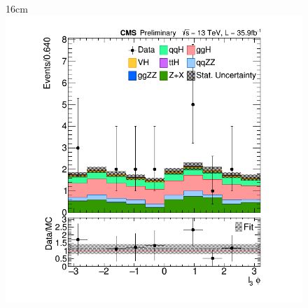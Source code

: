 \begin{figure}[hbtp]{16cm}
{		\includegraphics[scale=0.23,trim={2cm 1cm 2cm 1cm},clip]{ChapterAnalysis/figs/vbf_l3_phi}
	}\\
	\subfloat[]{
}
\end{figure}
